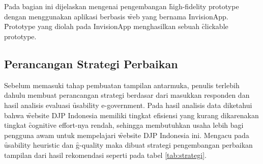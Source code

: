 \chapter{\babLima}
Pada bagian ini dijelaskan mengenai pengembangan \f{high-fidelity prototype} dengan menggunakan aplikasi berbasis \f{web} yang bernama InvisionApp. \f{Prototype} yang diolah pada InvisionApp menghasilkan sebuah \f{clickable prototype}.
\section{Perancangan Strategi Perbaikan}
Sebelum memasuki tahap pembuatan tampilan antarmuka, penulis terlebih dahulu membuat perancangan strategi berdasar dari masukkan responden dan hasil analisis evaluasi \f{usability e-government}. Pada hasil analisis data diketahui bahwa \f{website} DJP Indonesia memiliki tingkat efisiensi yang kurang dikarenakan tingkat \f{cognitive effort}-nya rendah, sehingga membutuhkan usaha lebih bagi pengguna awam untuk mempelajari \f{website} DJP Indonesia ini. Mengacu pada \f{usability heuristic} dan \f{g-quality} maka dibuat strategi pengembangan perbaikan tampilan dari hasil rekomendasi seperti pada tabel \ref{tab:strategi}.

